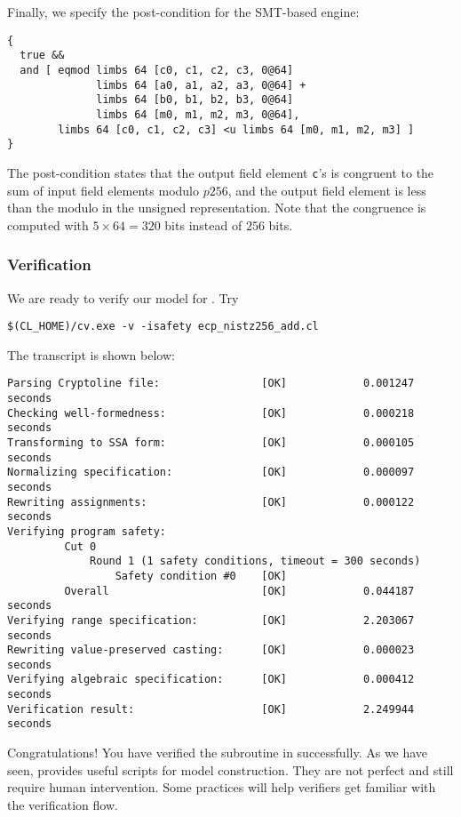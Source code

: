 \documentclass{amsproc}
\begin{document}
Finally, we specify the post-condition for the SMT-based engine:
\begin{verbatim}
{
  true && 
  and [ eqmod limbs 64 [c0, c1, c2, c3, 0@64]
              limbs 64 [a0, a1, a2, a3, 0@64] + 
              limbs 64 [b0, b1, b2, b3, 0@64]
              limbs 64 [m0, m1, m2, m3, 0@64],
        limbs 64 [c0, c1, c2, c3] <u limbs 64 [m0, m1, m2, m3] ]
}
\end{verbatim}
The post-condition states that the output field element \texttt{c}'s
is congruent to the sum of input field elements modulo $p256$, and the
output field element is less than the modulo in the unsigned
representation. Note that the congruence is computed with $5\times
64=320$ bits instead of $256$ bits.

\subsubsection{Verification}

We are ready to verify our \cryptoline model for \nistzadd. Try
\begin{verbatim}
$(CL_HOME)/cv.exe -v -isafety ecp_nistz256_add.cl
\end{verbatim}
The transcript is shown below:
\begin{verbatim}
Parsing Cryptoline file:                [OK]            0.001247 seconds
Checking well-formedness:               [OK]            0.000218 seconds
Transforming to SSA form:               [OK]            0.000105 seconds
Normalizing specification:              [OK]            0.000097 seconds
Rewriting assignments:                  [OK]            0.000122 seconds
Verifying program safety:
         Cut 0
             Round 1 (1 safety conditions, timeout = 300 seconds)
                 Safety condition #0    [OK]
         Overall                        [OK]            0.044187 seconds
Verifying range specification:          [OK]            2.203067 seconds
Rewriting value-preserved casting:      [OK]            0.000023 seconds
Verifying algebraic specification:      [OK]            0.000412 seconds
Verification result:                    [OK]            2.249944 seconds
\end{verbatim}

Congratulations! You have verified the \xeightysix \nistzadd
subroutine in \openssl successfully. As we have seen, \cryptoline
provides useful scripts for model construction. They are not perfect
and still require human intervention. Some practices will help
verifiers get familiar with the verification flow.
\end{document}
